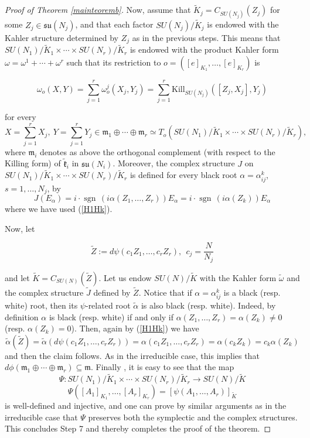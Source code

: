 \documentclass[reqno]{amsart}
\newcommand{\Kill}{{\mathrm{Kill}}}
\newcommand{\sgn}{{\operatorname{sgn\,}}}
\begin{document}
\begin{proof}[Proof of Theorem \ref{mainteoremb}]
Now, assume that $\tilde K_j = C_{SU(N_j)}(Z_j)$ for some $Z_ j \in \mathfrak{su}(N_j)$, and that each factor $SU(N_j)/\tilde K_j$ is endowed with the Kahler structure determined by $Z_j$ as in the previous steps. This means that $SU(N_1)/\tilde K_1 \times \cdots \times SU(N_r)/\tilde K_r$ is endowed with the product Kahler form $\omega = \omega^1 + \cdots + \omega^r$ such that its restriction to $o = ([e]_{K_1}, \dots, [e]_{K_r})$ is

\begin{equation}\label{prodKform}
\omega_o(X, Y) = \sum_{j=1}^r \omega_o^j(X_j, Y_j) = \sum_{j=1}^r \Kill_{SU(N_j)} ([Z_j, X_j], Y_j)
\end{equation}

for every 
$$X = \sum_{j=1}^r X_j, \ Y = \sum_{j=1}^r Y_j  \in  \mathfrak{m}_1 \oplus \cdots \oplus \mathfrak{m}_r \simeq T_o(SU(N_1)/\tilde K_1 \times \cdots \times SU(N_r)/\tilde K_r),$$ where $\mathfrak{m}_i$ denotes as above the orthogonal complement (with respect to the Killing form) of $\tilde{\mathfrak{k}}_i$ in $\mathfrak{su}(N_i)$.
Moreover, the complex structure $J$ on $SU(N_1)/\tilde K_1 \times \cdots \times SU(N_r)/\tilde K_r$ is defined for every black root $\alpha = \alpha^k_{ij}$, $s = 1, \dots, N_j$, by 
\begin{equation}\label{H1Hk2}
J(E_{\alpha}) = i \cdot \sgn(i \alpha(Z_1, \dots, Z_r)) E_{\alpha} = i \cdot \sgn(i \alpha(Z_k)) E_{\alpha}
\end{equation}
where we have used (\ref{H1Hk}).

Now, let

$$\tilde Z := d \psi(c_1 Z_1, \dots, c_r Z_r), \ \ c_j = \frac{N}{N_j}$$

and let $\tilde K = C_{SU(N)}(\tilde Z)$. Let us endow $SU(N)/\tilde K$ with the Kahler form $\tilde \omega$ and the complex structure $\tilde J$ defined by $\tilde Z$.
Notice that if $\alpha = \alpha^k_{ij}$ is a black (resp. white) root, then its $\psi$-related root $\tilde \alpha$ is also black (resp. white). Indeed, by definition $\alpha$ is black (resp. white) if and only if $\alpha(Z_1, \dots, Z_r) = \alpha(Z_k) \neq 0$ (resp. $\alpha(Z_k) = 0$). Then, again by (\ref{H1Hk}) we have
\begin{equation}\label{H1Hk3}
\tilde \alpha(\tilde Z) = \tilde \alpha(d \psi(c_1 Z_1, \dots, c_r Z_r)) = \alpha(c_1 Z_1, \dots, c_r Z_r) = \alpha(c_k Z_k) = c_k \alpha(Z_k)
\end{equation}
and then the claim follows. As in the irreducible case, this implies that $d \phi(\mathfrak{m}_1 \oplus \cdots \oplus \mathfrak{m}_r ) \subseteq \mathfrak{m}$.
Finally , it is easy to see that the map
$$\Psi: SU(N_1)/\tilde K_1 \times \cdots \times SU(N_r)/\tilde K_r \rightarrow SU(N)/\tilde K$$
$$\Psi([A_1]_{K_1}, \dots, [A_r]_{K_r}) = [\psi(A_1, \dots, A_r)]_{\tilde K}$$
 is well-defined and injective, and one can prove by similar arguments as in the irreducible case that $\Psi$ preserves both the symplectic and the complex structures.
This concludes Step 7 and thereby completes the proof of the theorem.
 \end{proof}
\end{document}
